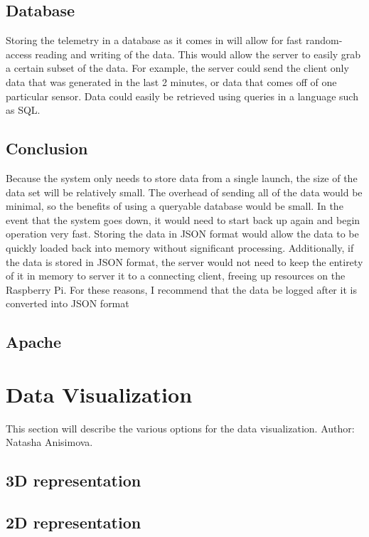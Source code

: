 \documentclass[10pt,draftclsnofoot,onecolumn]{IEEEtran}
\begin{document}
	\subsection{Database}
	Storing the telemetry in a database as it comes in will allow for fast random-access reading and writing of the data.
	This would allow the server to easily grab a certain subset of the data.
	For example, the server could send the client only data that was generated in the last 2 minutes, or data that comes off of one particular sensor.
	Data could easily be retrieved using queries in a language such as SQL.
	
	\subsection{Conclusion}
	Because the system only needs to store data from a single launch, the size of the data set will be relatively small.
	The overhead of sending all of the data would be minimal, so the benefits of using a queryable database would be small.
	In the event that the system goes down, it would need to start back up again and begin operation very fast.
	Storing the data in \ac{JSON} format would allow the data to be quickly loaded back into memory without significant processing.
	Additionally, if the data is stored in \ac{JSON} format, the server would not need to keep the entirety of it in memory to server it to a connecting client, freeing up resources on the Raspberry Pi.
	For these reasons, I recommend that the data be logged after it is converted into \ac{JSON} format
	

	\subsection{Apache}

	\section{Data Visualization}
	This section will describe the various options for the data visualization. Author: Natasha Anisimova.
	
	\subsection{3D representation}
	
	\subsection{2D representation}
	
\end{document}
